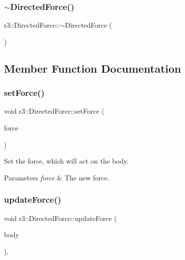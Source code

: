 \subsubsection{\texorpdfstring{$\sim$\+Directed\+Force()}{~DirectedForce()}}
{\footnotesize\ttfamily r3\+::\+Directed\+Force\+::$\sim$\+Directed\+Force (\begin{DoxyParamCaption}{ }\end{DoxyParamCaption})\hspace{0.3cm}{\ttfamily [default]}}



\subsection{Member Function Documentation}
\mbox{\label{classr3_1_1_directed_force_a5c25cdaa94e053ffd2614472d2a04c7e}} 
\subsubsection{\texorpdfstring{set\+Force()}{setForce()}}
{\footnotesize\ttfamily void r3\+::\+Directed\+Force\+::set\+Force (\begin{DoxyParamCaption}\item[{const glm\+::vec3 \&}]{force }\end{DoxyParamCaption})}



Set the force, which will act on the body. 


\begin{DoxyParams}{Parameters}
{\em force} & The new force. \\
\hline
\end{DoxyParams}
\mbox{\label{classr3_1_1_directed_force_a13dc064fe26dabe6c2803f027079e26b}} 
\subsubsection{\texorpdfstring{update\+Force()}{updateForce()}}
{\footnotesize\ttfamily void r3\+::\+Directed\+Force\+::update\+Force (\begin{DoxyParamCaption}\item[{\mbox{\hyperlink{classr3_1_1_rigid_body}{Rigid\+Body}} $\ast$}]{body }\end{DoxyParamCaption})\hspace{0.3cm}{\ttfamily [override]}, {\ttfamily [virtual]}}



